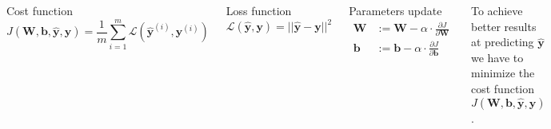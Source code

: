 \begin{frame}
    \begin{columns}
        \begin{block}{Cost function}
            $$
            J(\bm{W}, \bm{b}, \hat{\bm{y}}, \bm{y}) = 
            \frac{1}{m} \sum_{i=1}^{m} \mathcal{L}(\hat{\bm{y}}^{(i)}, \bm{y}^{(i)})
            $$
        \end{block}
        \begin{block}{Loss function}
            $$
            \mathcal{L}(\hat{\bm{y}}, \bm{y}) = ||\hat{\bm{y}} - \bm{y}||^2
            $$
        \end{block}
        \begin{block}{Parameters update}
            \begin{align*}
            \bm{W} &:= \bm{W} - \alpha \cdot \frac{\partial J}{\partial \bm{W}} \\
            \bm{b} &:= \bm{b} - \alpha \cdot \frac{\partial J}{\partial \bm{b}}
            \end{align*}
        \end{block}
        To achieve better results at predicting $\hat{\bm{y}}$ 
        we have to minimize the cost function $J(\bm{W}, \bm{b}, \hat{\bm{y}}, \bm{y})$.
    \end{columns}
\end{frame}